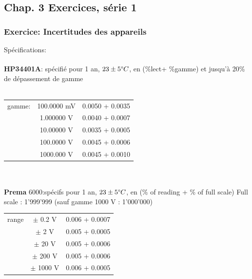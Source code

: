 \chapter{}
\chapter{}
\chapter{}

\section{Chap. 3 Exercices, série 1 }

\subsection{Exercice: Incertitudes des appareils }
Spécifications:\\
\\
\textbf{HP34401A}: spécifié pour 1 an, $23 \pm 5 \degree C$, en (\%lect+ \%gamme) et jusqu'à 20\% de dépassement de gamme\\
\\
\begin{tabular}{l c c}
    \hline
    gamme: & 100.0000 mV & 0.0050 + 0.0035 \\
           & 1.000000 V  & 0.0040 + 0.0007 \\
           & 10.00000 V  & 0.0035 + 0.0005 \\
           & 100.0000 V  & 0.0045 + 0.0006 \\
           & 1000.000 V  & 0.0045 + 0.0010 \\
    \hline
\end{tabular}
\\
\\
\textbf{Prema} 6000:spécifs pour 1 an, $23 \pm 5 \degree C$, en (\% of reading + \% of full scale)
Full scale : 1'999'999 (sauf gamme 1000 V : 1'000'000)
\\
\begin{tabular}{lcc}
    \hline
    range & $\pm$ 0.2 V  & 0.006 + 0.0007 \\
          & $\pm$ 2 V    & 0.005 + 0.0005 \\
          & $\pm$ 20 V   & 0.005 + 0.0006 \\
          & $\pm$ 200 V  & 0.005 + 0.0006 \\
          & $\pm$ 1000 V & 0.006 + 0.0005 \\
    \hline
\end{tabular}
